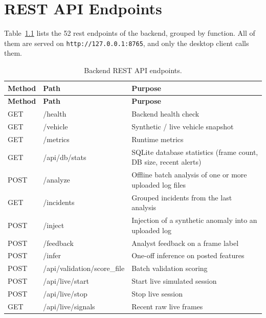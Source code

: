 \chapter{REST API Endpoints}
\label{app:api}

Table~\ref{tab:api-endpoints} lists the 52 \gls{rest} endpoints of the backend, grouped by function. All of them are served on \texttt{http://127.0.0.1:8765}, and only the desktop client calls them.

\footnotesize
\begin{longtable}{|p{1.4cm}|p{7.2cm}|p{6.0cm}|}
\caption{Backend REST API endpoints.}\label{tab:api-endpoints}\\
\hline
\textbf{Method} & \textbf{Path} & \textbf{Purpose} \\
\hline
\endfirsthead
\hline
\textbf{Method} & \textbf{Path} & \textbf{Purpose} \\
\hline
\endhead
GET  & /health                              & Backend health check \\
\hline
GET  & /vehicle                              & Synthetic / live vehicle snapshot \\
\hline
GET  & /metrics                               & Runtime metrics \\
\hline
GET  & /api/db/stats                          & SQLite database statistics (frame count, DB size, recent alerts) \\
\hline
POST & /analyze                                & Offline batch analysis of one or more uploaded log files \\
\hline
GET  & /incidents                             & Grouped incidents from the last analysis \\
\hline
POST & /inject                                & Injection of a synthetic anomaly into an uploaded log \\
\hline
POST & /feedback                              & Analyst feedback on a frame label \\
\hline
POST & /infer                                 & One-off inference on posted features \\
\hline
POST & /api/validation/score\_file            & Batch validation scoring \\
\hline
POST & /api/live/start                        & Start live simulated session \\
\hline
POST & /api/live/stop                         & Stop live session \\
\hline
GET  & /api/live/signals                      & Recent raw live frames \\

\end{longtable}
